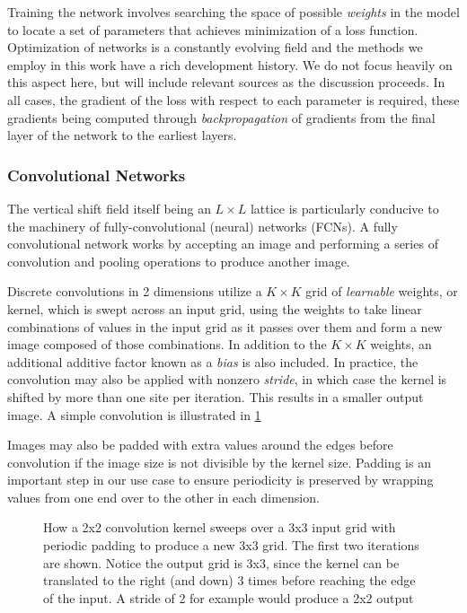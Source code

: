 \documentclass[12pt]{article}
\begin{document}
Training the network involves searching the space of possible \textit{weights} in the model to locate a set of parameters that achieves minimization
of a loss function. Optimization of networks is a constantly evolving field and the methods we employ in this work have a rich
development history. We do not focus heavily on this aspect here, but will include relevant sources as the discussion proceeds. In all cases,
the gradient of the loss with respect to each parameter is required, these gradients being computed through \textit{backpropagation} of gradients from the
final layer of the network to the earliest layers.

\subsubsection{Convolutional Networks}

The vertical shift field itself being an $L \times L$ lattice is particularly conducive to the machinery of fully-convolutional (neural)
networks (FCNs). A fully convolutional network works by accepting an image and performing a series of convolution and pooling operations
to produce another image. 

Discrete convolutions in 2 dimensions utilize a $K\times K$ grid of \textit{learnable} weights, or kernel, which is swept across an input grid, using the weights to take linear combinations of values 
in the input grid as it passes over them and form a new image composed of those combinations. 
In addition to the $K\times K$ weights, an additional additive factor known as a \textit{bias} is also included. In practice, the convolution
may also be applied with nonzero \textit{stride}, in which case the kernel is shifted by more than one site per iteration. This results in a smaller output image.
A simple convolution is illustrated in \ref{fig:conv2d}

Images may also be padded with extra values around the edges before convolution if the image size is not divisible by the kernel size. Padding 
is an important step in our use case to ensure periodicity is preserved by wrapping values from one end over to the other in each dimension.

\begin{figure}[h]
	\begin{center}
	
	\end{center}
	\caption[Convolution Demonstration]{How a 2x2 convolution kernel sweeps over a 3x3 input grid with periodic padding to produce a new 3x3 grid. The first two iterations are shown.
	Notice the output grid is 3x3, since the kernel can be translated to the right (and down) 3 times before reaching the edge of the input.
	A stride of 2 for example would produce a 2x2 output}
	\label{fig:conv2d}
\end{figure}
\end{document}
